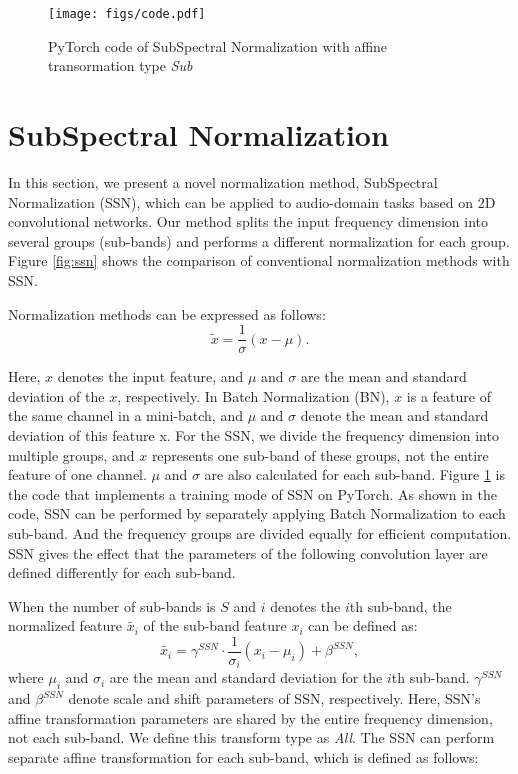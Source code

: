 \documentclass{article}
\begin{document}
\begin{figure}[t]
\centering
\texttt{[image: figs/code.pdf]}
\vskip -0.07in
\caption{PyTorch code of SubSpectral Normalization with affine transormation type \textit{Sub}} 
\label{fig:code}
\end{figure}

\section{SubSpectral Normalization}
\label{sec:method}
In this section, we present a novel normalization method, SubSpectral Normalization (SSN), which can be applied to audio-domain tasks based on 2D convolutional networks. Our method splits the input frequency dimension into several groups (sub-bands) and performs a different normalization for each group. Figure \ref{fig:ssn} shows the comparison of conventional normalization methods with SSN.

Normalization methods can be expressed as follows:
\begin{equation}
    \tilde{x} = \frac{1}{\sigma} (x - \mu).
\label{eq:norm}
\end{equation}

\noindent Here, $x$ denotes the input feature, and $\mu$ and $\sigma$ are the mean and standard deviation of the $x$, respectively.
In Batch Normalization (BN), $x$ is a feature of the same channel in a mini-batch, and $\mu$ and $\sigma$ denote the mean and standard deviation of this feature x. 
For the SSN, we divide the frequency dimension into multiple groups, and $x$ represents one sub-band of these groups, not the entire feature of one channel. $\mu$ and $\sigma$ are also calculated for each sub-band.
Figure \ref{fig:code} is the code that implements a training mode of SSN on PyTorch.  As shown in the code, SSN can be performed by separately applying Batch Normalization to each sub-band. And the frequency groups are divided equally for efficient computation. SSN gives the effect that the parameters of the following convolution layer are defined differently for each sub-band.

When the number of sub-bands is $S$ and $i$ denotes the $i$th sub-band, 
the normalized feature $\tilde{x_i}$ of the sub-band feature $x_i$ can be defined as:
\begin{equation}
    \tilde{x_i} = \gamma^{SSN}\cdot\frac{1}{\sigma_i} (x_i - \mu_i) + \beta^{SSN},
\label{eq:ssnorm_all}
\end{equation}
where $\mu_i$ and $\sigma_i$ are the mean and standard deviation for the $i$th sub-band. $\gamma^{SSN}$ and $\beta^{SSN}$ denote scale and shift parameters of SSN, respectively. Here, SSN's affine transformation parameters are shared by the entire frequency dimension, not each sub-band. We define this transform type as \textit{All}. The SSN can perform separate affine transformation for each sub-band, which is defined as follows:
\end{document}
